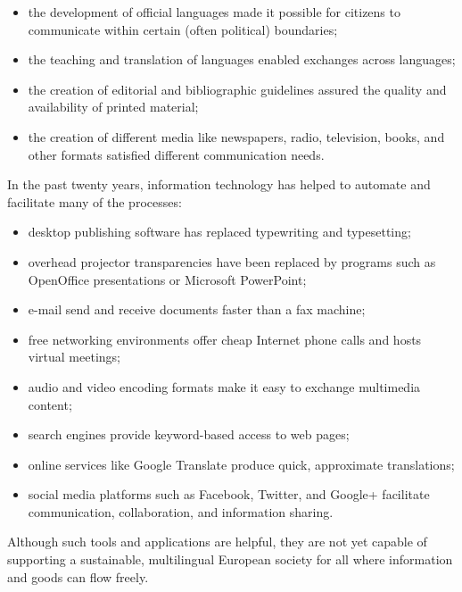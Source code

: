 \documentclass[]{../../metanetpaper}
\begin{document}
\begin{Parallel}[c]{70mm}{70mm}
{\begin{itemize}
\item the development of official languages made it possible for citizens to
communicate within certain (often political) boundaries;

\item the teaching and translation of languages enabled exchanges across languages;

\item the creation of editorial and bibliographic guidelines assured the quality and
availability of printed material;

\item the creation of different media like newspapers, radio, television, books, and
other formats satisfied different communication needs.
\end{itemize}
In the past twenty years, information technology has helped to automate and
facilitate many of the processes:
\begin{itemize}
\item desktop publishing software has replaced typewriting and typesetting;

\item overhead projector transparencies have been replaced by programs such as
OpenOffice presentations or Microsoft PowerPoint;

\item e-mail send and receive documents faster than a fax machine;

\item free networking environments offer cheap Internet phone calls and hosts virtual
meetings;

\item audio and video encoding formats make it easy to exchange multimedia content;

\item search engines provide keyword-based access to web pages;

\item online services like Google Translate produce quick, approximate translations;

\item social media platforms such as Facebook, Twitter, and Google+ facilitate
communication, collaboration, and information sharing.
\end{itemize}

Although such tools and applications are helpful, they are not yet capable of
supporting a sustainable, multilingual European society for all where
information and goods can flow freely.
}


\end{Parallel}
\end{document}
